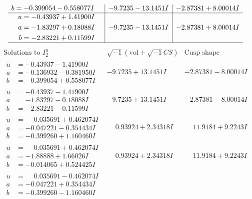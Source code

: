 \documentclass[1p]{elsarticle_modified}
\theoremstyle{definition}
\newcommand{\I}{\sqrt{-1}}
\begin{document}
$$\begin{array}{c|c|c}
\begin{aligned}
b &= -0.399054 - 0.558077 I\end{aligned}
 & -9.7235 - 13.1451 I & -2.87381 + 8.00014 I \\ \hline\begin{aligned}
u &= -0.43937 + 1.41900 I \\
a &= -1.83297 + 0.18088 I \\
b &= -2.83221 + 0.11599 I\end{aligned}
 & -9.7235 - 13.1451 I & -2.87381 + 8.00014 I\\
 \hline 
 \end{array}$$\newpage$$\begin{array}{c|c|c}  
\text{Solutions to }I^u_{2}& \I (\text{vol} + \sqrt{-1}CS) & \text{Cusp shape}\\
 \hline 
\begin{aligned}
u &= -0.43937 - 1.41900 I \\
a &= -0.136932 - 0.381950 I \\
b &= -0.399054 + 0.558077 I\end{aligned}
 & -9.7235 + 13.1451 I & -2.87381 - 8.00014 I \\ \hline\begin{aligned}
u &= -0.43937 - 1.41900 I \\
a &= -1.83297 - 0.18088 I \\
b &= -2.83221 - 0.11599 I\end{aligned}
 & -9.7235 + 13.1451 I & -2.87381 - 8.00014 I \\ \hline\begin{aligned}
u &= \phantom{-}0.035691 + 0.462074 I \\
a &= -0.047221 - 0.354434 I \\
b &= -0.399260 + 1.160460 I\end{aligned}
 & \phantom{-}0.93924 + 2.34318 I & \phantom{-}11.9184 + 9.2243 I \\ \hline\begin{aligned}
u &= \phantom{-}0.035691 + 0.462074 I \\
a &= -1.88888 + 1.66026 I \\
b &= -0.014065 + 0.524425 I\end{aligned}
 & \phantom{-}0.93924 + 2.34318 I & \phantom{-}11.9184 + 9.2243 I \\ \hline\begin{aligned}
u &= \phantom{-}0.035691 - 0.462074 I \\
a &= -0.047221 + 0.354434 I \\
b &= -0.399260 - 1.160460 I\end{aligned}

\end{array}$$
\end{document}
